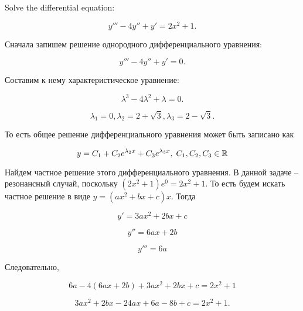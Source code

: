 \documentclass[addpoints, answers]{exam} %
\begin{document}
\begin{questions}

\question Solve the  differential equation:

\[
y''' -4y'' +y' =2x^{2} +1.
\]

\begin{solution}
Сначала запишем решение однородного дифференциального уравнения:

\[y''' -4y'' +y' =0.\]

Составим к нему характеристическое уравнение:

  \[\lambda ^{3} -4\lambda ^{2} +\lambda =0.\]

  \[\lambda _{1} =0,\lambda _{2} =2+\sqrt{3},\lambda _{3} =2-\sqrt{3}.\]

  То есть общее решение дифференциального уравнения может быть записано как

  \[y=C_{1} +C_{2} e^{\lambda_2 x} +C_{3} e^{\lambda_3 x},\; C_{1} ,C_{2} ,C_{3} \in \mathbb R \]

  Найдем частное решение этого дифференциального уравнения. В данной задаче -- резонансный случай, поскольку $\left(2x^{2} +1\right)e^{0} =2x^{2} +1$. То есть будем искать частное решение в виде $y=(ax^{2} +bx+c)x$. Тогда

  \[y' =3ax^{2} +2bx+c\]

  \[y'' =6ax+2b\]

  \[y''' =6a\]

  Следовательно,

  \[6a-4(6ax+2b)+3ax^{2} +2bx+c=2x^{2} +1\]

  \[3ax^{2} +2bx-24ax+6a-8b+c=2x^{2} +1.\]


\end{solution}
\end{questions}
\end{document}
